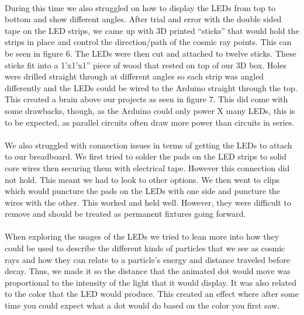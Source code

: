 \documentclass{article}
\begin{document}
\paragraph{}During this time we also struggled on how to display the LEDs from top to bottom and show different angles. After trial and error with the double sided tape on the LED strips, we came up with 3D printed “sticks” that would hold the strips in place and control the direction/path of the cosmic ray points. This can be seen in figure 6. The LEDs were then cut and attached to twelve sticks. These sticks fit into a 1’x1’x1” piece of wood that rested on top of our 3D box. Holes were drilled straight through at different angles so each strip was angled differently and the LEDs could be wired to the Arduino straight through the top. This created a brain above our projects as seen in figure 7. This did come with some drawbacks, though, as the Arduino could only power X many LEDs, this is to be expected, as parallel circuits often draw more power than circuits in series. 
\paragraph{}We also struggled with connection issues in terms of getting the LEDs to attach to our breadboard. We first tried to solder the pads on the LED strips to solid core wires then securing them with electrical tape. However this connection did not hold. This meant we had to look to other options. We then went to clips which would puncture the pads on the LEDs with one side and puncture the wires with the other. This worked and held well. However, they were difficult to remove and should be treated as permanent fixtures going forward. 

\paragraph{}When exploring the usages of the LEDs we tried to lean more into how they could be used to describe the different kinds of particles that we see as cosmic rays and how they can relate to a particle’s energy and distance traveled before decay. Thus, we made it so the distance that the animated dot would move was proportional to the intensity of the light that it would display. It was also related to the color that the LED would produce. This created an effect where after some time you could expect what a dot would do based on the color you first saw. 
\end{document}
